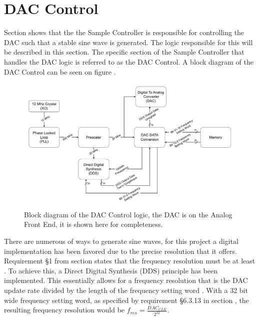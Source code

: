 \section{DAC Control} \label{subsec:DAC_CONTROL} 
Section  shows that the the Sample Controller is responsible for controlling the DAC such that a stable sine wave is generated. The logic responsible for this will be described in this section. The specific section of the Sample Controller that handles the DAC logic is referred to as the DAC Control. A block diagram of the DAC Control can be seen on figure .

\begin{figure}[H]
    \centering
    \includegraphics[clip, trim=0 0 0 0, width=1\textwidth]{Sections/7_SystemDesign/Figures/7_2_3_DAC_CONTROL.pdf}
    \caption{Block diagram of the DAC Control logic, the DAC is on the Analog Front End, it is shown here for completeness.}
    \label{fig:7_2_3_DAC_CONTROL}
\end{figure}

There are numerous of ways to generate sine waves, for this project a digital implementation has been favored due to the precise resolution that it offers. Requirement §1 from section  states that the frequency resolution must be at least . To achieve this, a Direct Digital Synthesis (DDS) principle has been implemented. This essentially allows for a frequency resolution that is the DAC update rate divided by the length of the frequency setting word \cite{Fundamentals_DDS}. With a 32 bit wide frequency setting word, as specified by requirement §6.3.13 in section , the resulting frequency resolution would be $f_{res} = \frac{DAC_{CLK}}{2^{32}}$.

